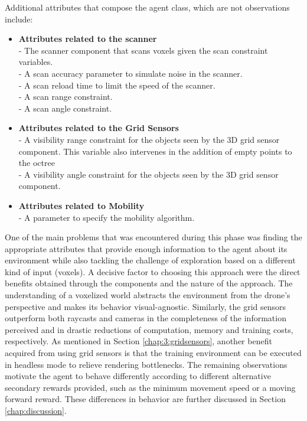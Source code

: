 Additional attributes that compose the agent class, which are not observations include:
\begin{itemize}
    \item \textbf{Attributes related to the scanner }
    \\ - The scanner component that scans voxels given the scan constraint variables.
    \\ - A scan accuracy parameter to simulate noise in the scanner.
    \\ - A scan reload time to limit the speed of the scanner.
    \\ - A scan range constraint.
    \\ - A scan angle constraint.
    \item \textbf{Attributes related to the Grid Sensors}
    \\ - A visibility range constraint for the objects seen by the 3D grid sensor component. This variable also intervenes in the addition of empty points to the octree
    \\ - A visibility angle constraint for the objects seen by the 3D grid sensor component.
    \item \textbf{Attributes related to Mobility}
    \\ - A parameter to specify the mobility algorithm. %

\end{itemize}


One of the main problems that was encountered during this phase was finding the appropriate attributes that provide enough information to the agent about its environment while also tackling the challenge of exploration based on a different kind of input (voxels). 
A decisive factor to choosing this approach were the direct benefits obtained through the components and the nature of the approach. The understanding of a voxelized world abstracts the environment from the drone's perspective and makes its behavior visual-agnostic. 
Similarly, the grid sensors outperform both raycasts and cameras in the completeness of the information perceived and in drastic reductions of computation, memory and training costs, respectively. 
As mentioned in Section \ref{chap:3:gridsensors}, another benefit acquired from using grid sensors is that the training environment can be executed in headless mode to relieve rendering bottlenecks. 
The remaining observations motivate the agent to behave differently according to different alternative secondary rewards provided, such as the minimum movement speed or a moving forward reward. These differences in behavior are further discussed in Section \ref{chap:discussion}.

